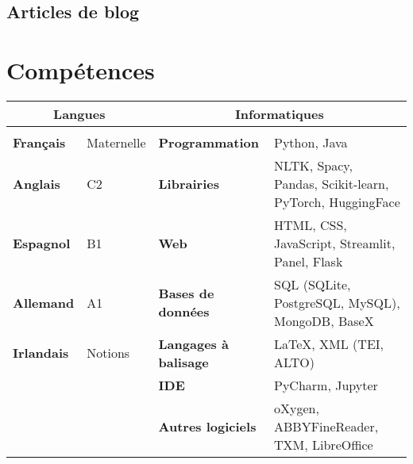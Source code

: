 \documentclass[11pt,a4paper,sans]{moderncv} %
\begin{document}
\subsection{Articles de blog}
\begin{refsection}
    \nocite{*}
    \printbibliography[heading=none]
\end{refsection}


\section{Compétences}
    \small
    \setlength{\tabcolsep}{5pt}
    \begin{tabular}{ll|ll}
    \multicolumn{2}{c}{\textbf{Langues}}   & \multicolumn{2}{c}{\textbf{Informatiques}}                                             \\
    \hline \\
    \textbf{Français}  & Maternelle & \textbf{Programmation}       & Python, Java                                            \\
    \textbf{Anglais}   & C2                & \textbf{Librairies}          & NLTK, Spacy, Pandas, Scikit-learn, PyTorch, HuggingFace \\
    \textbf{Espagnol}  & B1                & \textbf{Web}                 & HTML, CSS, JavaScript, Streamlit, Panel, Flask          \\
    \textbf{Allemand}  & A1                & \textbf{Bases de données}    & SQL (SQLite, PostgreSQL, MySQL), MongoDB, BaseX         \\
    \textbf{Irlandais} & Notions           & \textbf{Langages à balisage} & \LaTeX, XML (TEI, ALTO)                  \\
              &                   & \textbf{IDE}                 & PyCharm, Jupyter                                        \\
              &                   & \textbf{Autres logiciels}    & oXygen, ABBYFineReader, TXM, LibreOffice               
    \end{tabular}



\end{document}
